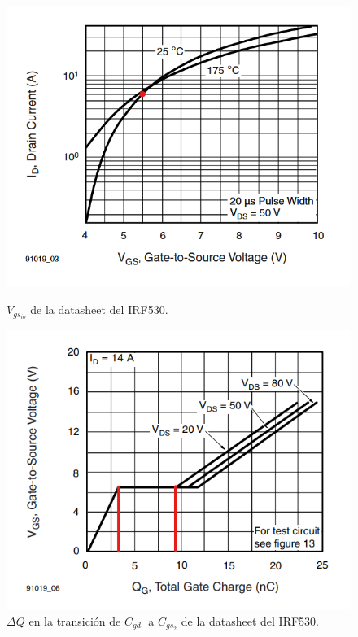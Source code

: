 \begin{figure}[H]
	\centering
	\begin{minipage}{0.45\textwidth}
		\centering
		\includegraphics[width=\textwidth]{ImagenesEjercicio-1/Vgs-Id_LI} %
		\caption{$V_{gs_{io}}$ de la datasheet del IRF530.}
		\label{ej1:fig:vgsio}
	\end{minipage}\hfill
	\begin{minipage}{0.45\textwidth}
		\centering
		\includegraphics[width=\textwidth]{ImagenesEjercicio-1/deltaq} %
		\caption{$\Delta Q$ en la transición de $C_{gd_1}$ a $C_{gs_2}$ de la datasheet del IRF530.}
		\label{ej1:fig:deltaq}
	\end{minipage}
\end{figure}

